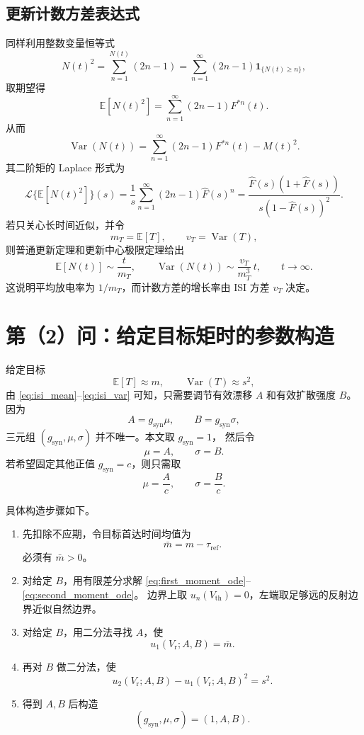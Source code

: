 \documentclass[UTF8]{ctexart}
\begin{document}
\subsection{更新计数方差表达式}

同样利用整数变量恒等式
\[
N(t)^2=\sum_{n=1}^{N(t)}(2n-1)
=\sum_{n=1}^{\infty}(2n-1)\mathbf 1_{\{N(t)\ge n\}},
\]
取期望得
\begin{equation}
\mathbb E[N(t)^2]
=\sum_{n=1}^{\infty}(2n-1)F^{*n}(t).
\label{eq:renewal_second_exact}
\end{equation}
从而
\begin{equation}
\operatorname{Var}(N(t))
=\sum_{n=1}^{\infty}(2n-1)F^{*n}(t)-M(t)^2.
\label{eq:renewal_var_exact}
\end{equation}
其二阶矩的 Laplace 形式为
\begin{equation}
\mathcal L\{\mathbb E[N(t)^2]\}(s)
=\frac{1}{s}\sum_{n=1}^{\infty}(2n-1)\widehat F(s)^n
=\frac{\widehat F(s)(1+\widehat F(s))}
{s(1-\widehat F(s))^2}.
\label{eq:renewal_second_laplace}
\end{equation}
若只关心长时间近似，并令
\[
m_T=\mathbb E[T],\qquad v_T=\operatorname{Var}(T),
\]
则普通更新定理和更新中心极限定理给出
\begin{equation}
\mathbb E[N(t)]\sim \frac{t}{m_T},
\qquad
\operatorname{Var}(N(t))\sim \frac{v_T}{m_T^3}\,t,
\qquad t\to\infty.
\label{eq:renewal_asymptotic}
\end{equation}
这说明平均放电率为 $1/m_T$，而计数方差的增长率由 ISI 方差 $v_T$ 决定。

\section{第（2）问：给定目标矩时的参数构造}

给定目标
\[
\mathbb E[T]\approx m,\qquad \operatorname{Var}(T)\approx s^2,
\]
由 \eqref{eq:isi_mean}--\eqref{eq:isi_var} 可知，只需要调节有效漂移 $A$ 和有效扩散强度
$B$。因为
\[
A=g_{\mathrm{syn}}\mu,\qquad B=g_{\mathrm{syn}}\sigma,
\]
三元组 $(g_{\mathrm{syn}},\mu,\sigma)$ 并不唯一。本文取 $g_{\mathrm{syn}}=1$，
然后令
\[
\mu=A,\qquad \sigma=B.
\]
若希望固定其他正值 $g_{\mathrm{syn}}=c$，则只需取
\[
\mu=\frac{A}{c},\qquad \sigma=\frac{B}{c}.
\]

具体构造步骤如下。

\begin{enumerate}
\item 先扣除不应期，令目标首达时间均值为
\[
\bar m=m-\tau_{\mathrm{ref}}.
\]
必须有 $\bar m>0$。
\item 对给定 $B$，用有限差分求解 \eqref{eq:first_moment_ode}--\eqref{eq:second_moment_ode}。
边界上取 $u_n(V_{\mathrm{th}})=0$，左端取足够远的反射边界近似自然边界。
\item 对给定 $B$，用二分法寻找 $A$，使
\[
u_1(V_{\mathrm r};A,B)=\bar m.
\]
\item 再对 $B$ 做二分法，使
\[
u_2(V_{\mathrm r};A,B)-u_1(V_{\mathrm r};A,B)^2=s^2.
\]
\item 得到 $A,B$ 后构造
\[
(g_{\mathrm{syn}},\mu,\sigma)=\left(1,A,B\right).
\]
\end{enumerate}
\end{document}
